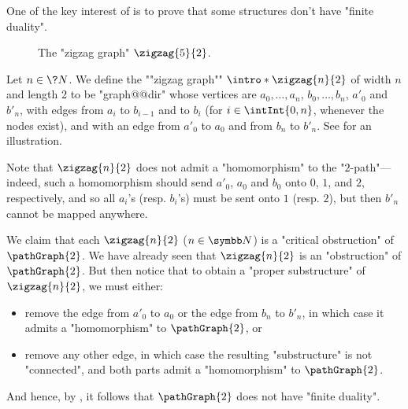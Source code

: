 One of the key interest of  is
to prove that some structures don't have "finite duality".

\begin{figure}
	\centering
	\begin{tikzpicture}
		
		
	\end{tikzpicture}
	\caption{\AP\label{fig:zigzag-graph}The "zigzag graph" $\zigzag{5}{2}$.}
\end{figure}
\begin{example}
	\AP\label{ex:zigzag-defn}
	Let $n\in\?N$.
	We define the \AP""zigzag graph"" $\intro*\zigzag{n}{2}$ of width $n$ and length 2
	to be "graph@@dir" whose vertices are $a_0, \dotsc, a_n$, $b_0, \dotsc, b_{n}$,
	$a'_0$ and $b'_n$, with edges from $a_i$ to $b_{i-1}$ and to $b_{i}$ (for $i \in \intInt{0,n}$, whenever the nodes exist), and with an edge from $a'_0$ to $a_0$ and from $b_n$
	to $b'_n$. See  for an illustration.
	
	Note that $\zigzag{n}{2}$ does not admit a "homomorphism" to the "$2$-path"---indeed, such a homomorphism should send $a'_0$, $a_0$ and $b_0$ onto $0$, $1$, and $2$, respectively, 
	and so all $a_i$'s (resp. $b_i$'s) must be sent onto $1$ (resp. $2$), but then $b'_n$ cannot be mapped anywhere.

	We claim that each $\zigzag{n}{2}$ ($n\in\N$) is a "critical obstruction" of $\pathGraph{2}$.
	We have already seen that $\zigzag{n}{2}$ is an "obstruction" of $\pathGraph{2}$.
	But then notice that to obtain a "proper substructure" of $\zigzag{n}{2}$,
	we must either:
	\begin{itemize}
		\item remove the edge from $a'_0$ to $a_0$ or the edge from $b_n$ to $b'_n$,
		in which case it admits a "homomorphism" to $\pathGraph{2}$, or
		\item remove any other edge, in which case the resulting "substructure" is not "connected",
		and both parts admit a "homomorphism" to $\pathGraph{2}$.
	\end{itemize}
	And hence, by , it follows that
	$\pathGraph{2}$ does not have "finite duality".


\end{example}
